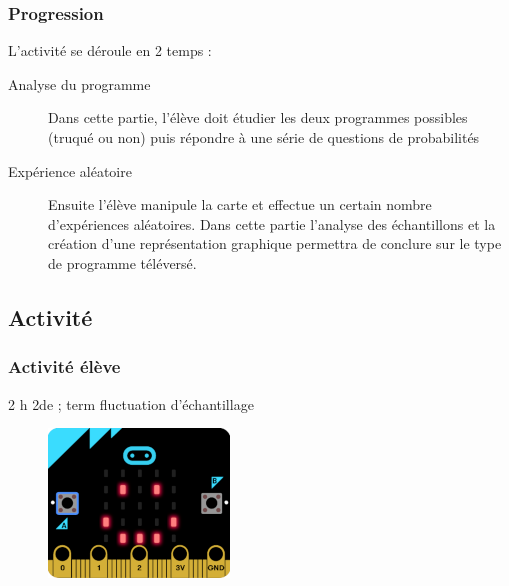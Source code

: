 \subsubsection{Progression}

L'activité se déroule en 2 temps :
\begin{description}
    \item[Analyse du programme] Dans cette partie, l'élève doit étudier les deux programmes possibles (truqué ou non) puis répondre à une série de questions de probabilités
    \item[Expérience aléatoire] Ensuite l'élève manipule la carte \mb et effectue un certain nombre d'expériences aléatoires. Dans cette partie l'analyse des échantillons et la création d'une représentation graphique permettra de conclure sur le type de programme téléversé.
\end{description}

%
%

\newpage

\subsection{Activité}

\subsubsection{Activité élève}

\cartouche
{2 h}         %
{2de ; term}           %
{fluctuation d'échantillage}        %
{}     %
{}       %


\begin{figure}\rule{0cm}{2pt}
    \includegraphics[width=\linewidth]{res/mb-truque-mini.png}
\end{figure}

